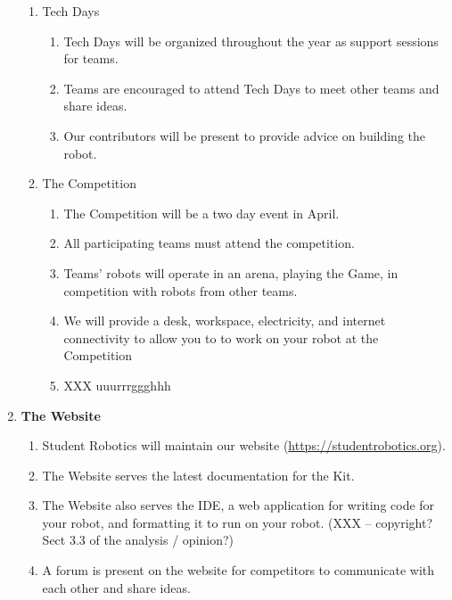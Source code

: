 \documentclass[a4paper, 11pt]{scrartcl}
\begin{document}
\begin{enumerate}
\begin{enumerate}
\item Tech Days

\begin{enumerate}
\item Tech Days will be organized throughout the year as support sessions for
teams.

\item Teams are encouraged to attend Tech Days to meet other teams and share
ideas.

\item Our contributors will be present to provide advice on building the robot.
\end{enumerate}

\item The Competition
\begin{enumerate}

\item The Competition will be a two day event in April.

\item All participating teams must attend the competition.

\item Teams' robots will operate in an arena, playing the Game, in competition
with robots from other teams.

\item We will provide a desk, workspace, electricity, and internet connectivity
to allow you to to work on your robot at the Competition

\item XXX uuurrrggghhh

\end{enumerate}
\end{enumerate}

\item \textbf{The Website}
\begin{enumerate}

\item Student Robotics will maintain our website (\url{https://studentrobotics.org}).

\item The Website serves the latest documentation for the Kit.

\item The Website also serves the IDE, a web application for writing code for
your robot, and formatting it to run on your robot. (XXX -- copyright?
Sect 3.3 of the analysis / opinion?)

\item A forum is present on the website for competitors to communicate with
each other and share ideas.


\end{enumerate}
\end{enumerate}
\end{document}

